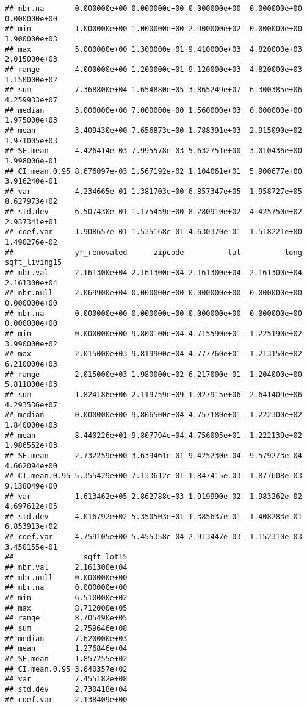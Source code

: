 \documentclass[
]{article}
\begin{document}
\begin{verbatim}
## nbr.na       0.000000e+00 0.000000e+00 0.000000e+00  0.000000e+00 0.000000e+00
## min          1.000000e+00 1.000000e+00 2.900000e+02  0.000000e+00 1.900000e+03
## max          5.000000e+00 1.300000e+01 9.410000e+03  4.820000e+03 2.015000e+03
## range        4.000000e+00 1.200000e+01 9.120000e+03  4.820000e+03 1.150000e+02
## sum          7.368800e+04 1.654880e+05 3.865249e+07  6.300385e+06 4.259933e+07
## median       3.000000e+00 7.000000e+00 1.560000e+03  0.000000e+00 1.975000e+03
## mean         3.409430e+00 7.656873e+00 1.788391e+03  2.915090e+02 1.971005e+03
## SE.mean      4.426414e-03 7.995578e-03 5.632751e+00  3.010436e+00 1.998006e-01
## CI.mean.0.95 8.676097e-03 1.567192e-02 1.104061e+01  5.900677e+00 3.916240e-01
## var          4.234665e-01 1.381703e+00 6.857347e+05  1.958727e+05 8.627973e+02
## std.dev      6.507430e-01 1.175459e+00 8.280910e+02  4.425750e+02 2.937341e+01
## coef.var     1.908657e-01 1.535168e-01 4.630370e-01  1.518221e+00 1.490276e-02
##              yr_renovated      zipcode          lat          long sqft_living15
## nbr.val      2.161300e+04 2.161300e+04 2.161300e+04  2.161300e+04  2.161300e+04
## nbr.null     2.069900e+04 0.000000e+00 0.000000e+00  0.000000e+00  0.000000e+00
## nbr.na       0.000000e+00 0.000000e+00 0.000000e+00  0.000000e+00  0.000000e+00
## min          0.000000e+00 9.800100e+04 4.715590e+01 -1.225190e+02  3.990000e+02
## max          2.015000e+03 9.819900e+04 4.777760e+01 -1.213150e+02  6.210000e+03
## range        2.015000e+03 1.980000e+02 6.217000e-01  1.204000e+00  5.811000e+03
## sum          1.824186e+06 2.119759e+09 1.027915e+06 -2.641409e+06  4.293536e+07
## median       0.000000e+00 9.806500e+04 4.757180e+01 -1.222300e+02  1.840000e+03
## mean         8.440226e+01 9.807794e+04 4.756005e+01 -1.222139e+02  1.986552e+03
## SE.mean      2.732259e+00 3.639461e-01 9.425230e-04  9.579273e-04  4.662094e+00
## CI.mean.0.95 5.355429e+00 7.133612e-01 1.847415e-03  1.877608e-03  9.138049e+00
## var          1.613462e+05 2.862788e+03 1.919990e-02  1.983262e-02  4.697612e+05
## std.dev      4.016792e+02 5.350503e+01 1.385637e-01  1.408283e-01  6.853913e+02
## coef.var     4.759105e+00 5.455358e-04 2.913447e-03 -1.152310e-03  3.450155e-01
##                sqft_lot15
## nbr.val      2.161300e+04
## nbr.null     0.000000e+00
## nbr.na       0.000000e+00
## min          6.510000e+02
## max          8.712000e+05
## range        8.705490e+05
## sum          2.759646e+08
## median       7.620000e+03
## mean         1.276846e+04
## SE.mean      1.857255e+02
## CI.mean.0.95 3.640357e+02
## var          7.455182e+08
## std.dev      2.730418e+04
## coef.var     2.138409e+00
\end{verbatim}
\end{document}
